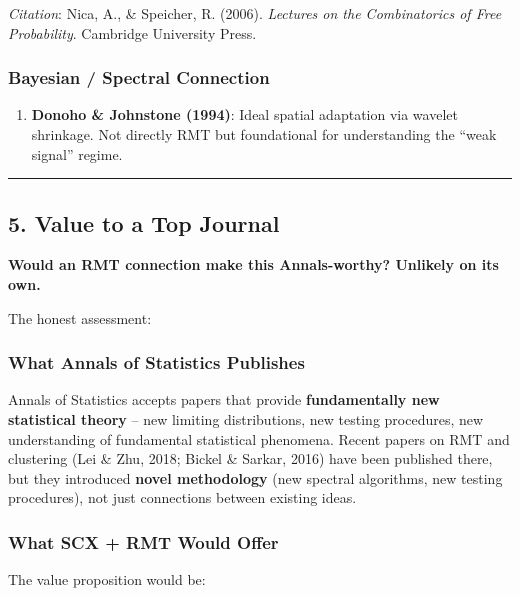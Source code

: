 \documentclass[
  12pt,
]{article}
\providecommand{\tightlist}{%
  \setlength{\itemsep}{0pt}\setlength{\parskip}{0pt}}
\begin{document}
\emph{Citation}: Nica, A., \& Speicher, R. (2006). \emph{Lectures on the
Combinatorics of Free Probability}. Cambridge University Press.

\subsubsection{Bayesian / Spectral
Connection}\label{bayesian-spectral-connection}

\begin{enumerate}
\def\labelenumi{\arabic{enumi}.}
\setcounter{enumi}{10}
\tightlist
\item
  \textbf{Donoho \& Johnstone (1994)}: Ideal spatial adaptation via
  wavelet shrinkage. Not directly RMT but foundational for understanding
  the ``weak signal'' regime.
\end{enumerate}

\begin{center}\rule{0.5\linewidth}{0.5pt}\end{center}

\subsection{5. Value to a Top Journal}\label{value-to-a-top-journal}

\textbf{Would an RMT connection make this Annals-worthy? Unlikely on its
own.}

The honest assessment:

\subsubsection{What Annals of Statistics
Publishes}\label{what-annals-of-statistics-publishes}

Annals of Statistics accepts papers that provide \textbf{fundamentally
new statistical theory} -- new limiting distributions, new testing
procedures, new understanding of fundamental statistical phenomena.
Recent papers on RMT and clustering (Lei \& Zhu, 2018; Bickel \& Sarkar,
2016) have been published there, but they introduced \textbf{novel
methodology} (new spectral algorithms, new testing procedures), not just
connections between existing ideas.

\subsubsection{What SCX + RMT Would
Offer}\label{what-scx-rmt-would-offer}

The value proposition would be:
\end{document}
